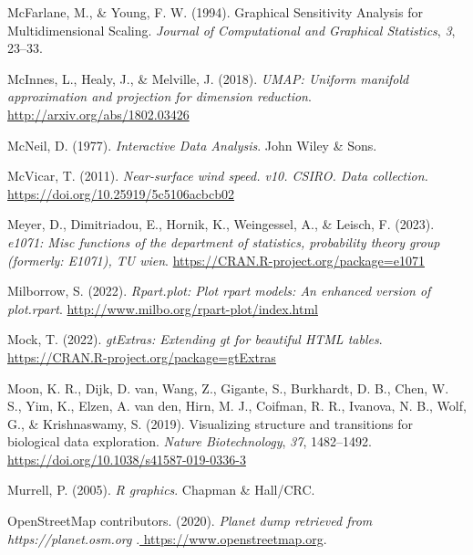 \documentclass[
  letterpaper,
]{krantz}
\newlength{\cslhangindent}
\newlength{\cslentryspacingunit} %
\newenvironment{CSLReferences}[2] %
 {%
  \setlength{\parindent}{0pt}
  \ifodd #1
  \let\oldpar\par
  \def\par{\hangindent=\cslhangindent\oldpar}
  \fi
  \setlength{\parskip}{#2\cslentryspacingunit}
 }%
 {}
\begin{document}
\begin{CSLReferences}{1}{0}
\leavevmode{}%
McFarlane, M., \& Young, F. W. (1994). Graphical {S}ensitivity
{A}nalysis for {M}ultidimensional {S}caling. \emph{Journal of
Computational and Graphical Statistics}, \emph{3}, 23--33.

\leavevmode{}%
McInnes, L., Healy, J., \& Melville, J. (2018). \emph{{UMAP}: Uniform
manifold approximation and projection for dimension reduction}.
\url{http://arxiv.org/abs/1802.03426}

\leavevmode{}%
McNeil, D. (1977). \emph{Interactive {D}ata {A}nalysis}. John Wiley \&
Sons.

\leavevmode{}%
McVicar, T. (2011). \emph{Near-surface wind speed. v10. CSIRO. Data
collection.} \url{https://doi.org/10.25919/5c5106acbcb02}

\leavevmode{}%
Meyer, D., Dimitriadou, E., Hornik, K., Weingessel, A., \& Leisch, F.
(2023). \emph{e1071: Misc functions of the department of statistics,
probability theory group (formerly: E1071), TU wien}.
\url{https://CRAN.R-project.org/package=e1071}

\leavevmode{}%
Milborrow, S. (2022). \emph{Rpart.plot: Plot rpart models: An enhanced
version of plot.rpart}. \url{http://www.milbo.org/rpart-plot/index.html}

\leavevmode{}%
Mock, T. (2022). \emph{gtExtras: Extending gt for beautiful HTML
tables}. \url{https://CRAN.R-project.org/package=gtExtras}

\leavevmode{}%
Moon, K. R., Dijk, D. van, Wang, Z., Gigante, S., Burkhardt, D. B.,
Chen, W. S., Yim, K., Elzen, A. van den, Hirn, M. J., Coifman, R. R.,
Ivanova, N. B., Wolf, G., \& Krishnaswamy, S. (2019). Visualizing
structure and transitions for biological data exploration. \emph{Nature
Biotechnology}, \emph{37}, 1482--1492.
\url{https://doi.org/10.1038/s41587-019-0336-3}

\leavevmode{}%
Murrell, P. (2005). \emph{R graphics}. Chapman \& Hall/CRC.

\leavevmode{}%
OpenStreetMap contributors. (2020). \emph{{Planet dump retrieved from
https://planet.osm.org
}}.\href{\%20https://www.openstreetmap.org\%20}{ https://www.openstreetmap.org}.


\end{CSLReferences}
\end{document}
